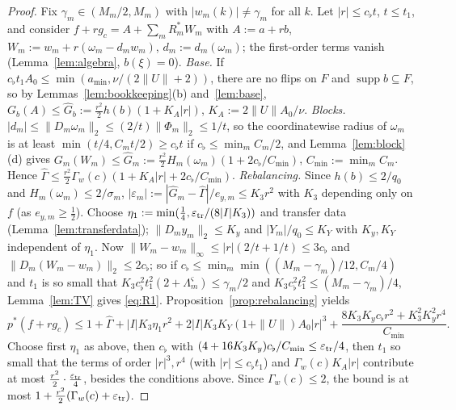 \documentclass[10pt]{amsart}
\theoremstyle{definition}
\theoremstyle{remark}
\newcommand{\supp}{\operatorname{supp}}
\begin{document}
\begin{proof}
Fix $\gamma_m\in(M_m/2,M_m)$ with $|w_m(k)|\ne\gamma_m$ for all $k$.  Let
$|r|\le c_{\flat}t$, $t\le t_1$, and consider $f+rg_c=A+\sum_mR^*_mW_m$ with
$A:=a+rb$, $W_m:=w_m+r(\omega_m-d_mw_m)$, $d_m:=d_m(\omega_m)$; the
first-order terms vanish (Lemma~\ref{lem:algebra}, $b(\xi)=0$).
\emph{Base.}  If $c_{\flat}t_1A_0\le\min(a_{\min},\nu/(2\|U\|+2))$, there are no
flips on $F$ and $\supp b\subseteq F$, so by
Lemmas~\ref{lem:bookkeeping}(b) and~\ref{lem:base},
$G_b(A)\le\hat G_b:=\frac{r^2}2h(b)(1+K_A|r|)$, $K_A:=2\|U\|A_0/\nu$.
\emph{Blocks.}  $|d_m|\le\|D_m\omega_m\|_2\le(2/t)\|\Phi_m\|_2\le1/t$, so the
coordinatewise radius of $\omega_m$ is at least $\min(t/4,C_mt/2)\ge c_{\flat}t$
if $c_{\flat}\le\min_mC_m/2$, and Lemma~\ref{lem:block}(d) gives $G_m(W_m)\le\hat
G_m:=\frac{r^2}2H_m(\omega_m)(1+2c_{\flat}/C_{\min})$, $C_{\min}:=\min_mC_m$.
Hence $\hat\Gamma\le\frac{r^2}2\Gamma_w(c)(1+K_A|r|+2c_{\flat}/C_{\min})$.
\emph{Rebalancing.}  Since $h(b)\le2/q_0$ and $H_m(\omega_m)\le2/\sigma_m$,
$|\varepsilon_m|:=|\hat G_m-\hat\Gamma|/e_{y,m}\le K_3r^2$ with $K_3$
depending only on $f$ (as $e_{y,m}\ge\frac12$).  Choose
$\eta_1:=\min(\frac14,\varepsilon_{\rm tr}/(8|I|K_3))$ and transfer data
(Lemma~\ref{lem:transferdata}); $\|D_my_m\|_2\le K_y$ and $|Y_m|/q_0\le K_Y$
with $K_y,K_Y$ independent of $\eta_1$.  Now $\|W_m-w_m\|_\infty\le
|r|(2/t+1/t)\le3c_{\flat}$ and $\|D_m(W_m-w_m)\|_2\le2c_{\flat}$; so if $c_{\flat}\le
\min_m\min((M_m-\gamma_m)/12,C_m/4)$ and $t_1$ is so small that $K_3c_{\flat}^2t_1^2
(2+\Lambda^\varsigma_m)\le\gamma_m/2$ and $K_3c_{\flat}^2t_1^2\le(M_m-\gamma_m)/4$,
Lemma~\ref{lem:TV} gives \eqref{eq:R1}.  Proposition~\ref{prop:rebalancing}
yields
\[
 p^*(f+rg_c)\le1+\hat\Gamma+|I|K_3\eta_1r^2+2|I|K_3K_Y(1+\|U\|)A_0|r|^3+
 \frac{8K_3K_yc_{\flat}r^2+K_3^2K_y^2r^4}{C_{\min}} .
\]
Choose first $\eta_1$ as above, then $c_{\flat}$ with
$(4+16K_3K_y)c_{\flat}/C_{\min}\le\varepsilon_{\rm tr}/4$, then $t_1$ so small that
the terms of order $|r|^3,r^4$ (with $|r|\le c_{\flat}t_1$) and $\Gamma_w(c)K_A|r|$
contribute at most $\frac{r^2}2\cdot\frac{\varepsilon_{\rm tr}}4$, besides the
conditions above.  Since $\Gamma_w(c)\le2$, the bound is at most
$1+\frac{r^2}2(\Gamma_w(c)+\varepsilon_{\rm tr})$.
\end{proof}
\end{document}
